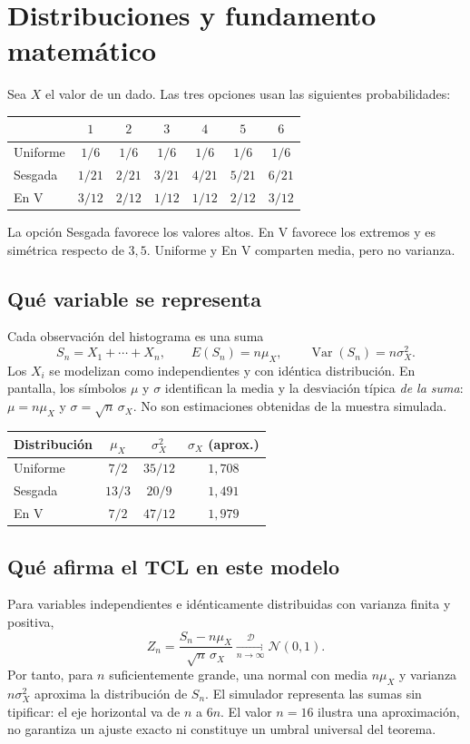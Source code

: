 \documentclass[11pt,a4paper]{article}
\begin{document}
\clearpage\section{Distribuciones y fundamento matemático}
Sea $X$ el valor de un dado. Las tres opciones usan las siguientes probabilidades:
\begin{center}\begin{tabular}{@{}lcccccc@{}}\toprule
 & $1$ & $2$ & $3$ & $4$ & $5$ & $6$\\\midrule
Uniforme & $1/6$ & $1/6$ & $1/6$ & $1/6$ & $1/6$ & $1/6$\\
Sesgada & $1/21$ & $2/21$ & $3/21$ & $4/21$ & $5/21$ & $6/21$\\
En V & $3/12$ & $2/12$ & $1/12$ & $1/12$ & $2/12$ & $3/12$\\\bottomrule
\end{tabular}\end{center}
La opción Sesgada favorece los valores altos. En V favorece los extremos y es simétrica respecto de $3{,}5$. Uniforme y En V comparten media, pero no varianza.

\subsection{Qué variable se representa}
Cada observación del histograma es una suma
\[
S_n=X_1+\cdots+X_n,
\qquad E(S_n)=n\mu_X,\qquad \operatorname{Var}(S_n)=n\sigma_X^2.
\]
Los $X_i$ se modelizan como independientes y con idéntica distribución. En pantalla, los símbolos $\mu$ y $\sigma$ identifican la media y la desviación típica \emph{de la suma}: $\mu=n\mu_X$ y $\sigma=\sqrt n\,\sigma_X$. No son estimaciones obtenidas de la muestra simulada.

\begin{center}\begin{tabular}{@{}lccc@{}}\toprule
Distribución & $\mu_X$ & $\sigma_X^2$ & $\sigma_X$ (aprox.)\\\midrule
Uniforme & $7/2$ & $35/12$ & $1{,}708$\\
Sesgada & $13/3$ & $20/9$ & $1{,}491$\\
En V & $7/2$ & $47/12$ & $1{,}979$\\\bottomrule
\end{tabular}\end{center}

\subsection{Qué afirma el TCL en este modelo}
Para variables independientes e idénticamente distribuidas con varianza finita y positiva,
\[
Z_n=\frac{S_n-n\mu_X}{\sqrt n\,\sigma_X}
\xrightarrow[n\to\infty]{\mathcal D}\mathcal N(0,1).
\]
Por tanto, para $n$ suficientemente grande, una normal con media $n\mu_X$ y varianza $n\sigma_X^2$ aproxima la distribución de $S_n$. El simulador representa las sumas sin tipificar: el eje horizontal va de $n$ a $6n$. El valor $n=16$ ilustra una aproximación, no garantiza un ajuste exacto ni constituye un umbral universal del teorema.
\end{document}
